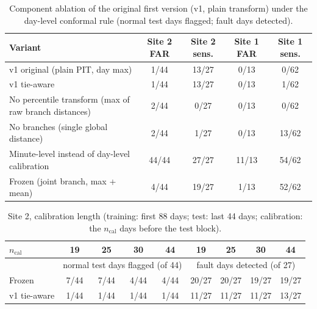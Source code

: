 \begin{table}[h!]\centering\footnotesize\caption{Component ablation of the original first version (v1, plain transform) under the day-level conformal rule (normal test days flagged; fault days detected).}\label{tab:S2}
\begin{tabular}{lcccc}\toprule
Variant & Site 2 FAR & Site 2 sens. & Site 1 FAR & Site 1 sens.\\\midrule
v1 original (plain PIT, day max) & 1/44 & 13/27 & 0/13 & 0/62\\
v1 tie-aware & 1/44 & 13/27 & 0/13 & 1/62\\
No percentile transform (max of raw branch distances) & 2/44 & 0/27 & 0/13 & 0/62\\
No branches (single global distance) & 2/44 & 1/27 & 0/13 & 13/62\\
Minute-level instead of day-level calibration & 44/44 & 27/27 & 11/13 & 54/62\\
Frozen (joint branch, max + mean) & 4/44 & 19/27 & 1/13 & 52/62\\
\bottomrule\end{tabular}\end{table}

\begin{table}[h!]\centering\footnotesize\caption{Site 2, calibration length (training: first 88 days; test: last 44 days; calibration: the $n_{\mathrm{cal}}$ days before the test block).}\label{tab:S3}
\begin{tabular}{lcccccccc}\toprule
$n_{\mathrm{cal}}$ & 19 & 25 & 30 & 44 & 19 & 25 & 30 & 44\\\midrule
& \multicolumn{4}{c}{normal test days flagged (of 44)} & \multicolumn{4}{c}{fault days detected (of 27)}\\
Frozen & 7/44 & 7/44 & 4/44 & 4/44 & 20/27 & 20/27 & 19/27 & 19/27\\
v1 tie-aware & 1/44 & 1/44 & 1/44 & 1/44 & 11/27 & 11/27 & 11/27 & 13/27\\
\bottomrule\end{tabular}\end{table}

